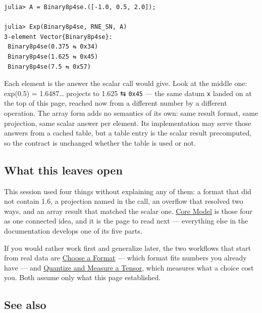 \label{13141607623874117758}{}



\begin{verbatim}
julia> A = Binary8p4se.([-1.0, 0.5, 2.0]);

julia> Exp(Binary8p4se, RNE_SN, A)
3-element Vector{Binary8p4se}:
 Binary8p4se(0.375 ⇆ 0x34)
 Binary8p4se(1.625 ⇆ 0x45)
 Binary8p4se(7.5 ⇆ 0x57)
\end{verbatim}



Each element is the answer the scalar call would give. Look at the middle one: exp(0.5) = 1.6487… projects to 1.625 ⇆ \texttt{0x45} — the same datum \texttt{x} landed on at the top of this page, reached now from a different number by a different operation. The array form adds no semantics of its own: same result format, same projection, same scalar answer per element. Its implementation may serve those answers from a cached table, but a table entry is the scalar result precomputed, so the contract is unchanged whether the table is used or not.



\subsection{What this leaves open}



\label{15263504601444045058}{}


This session used four things without explaining any of them: a format that did not contain 1.6, a projection named in the call, an overflow that resolved two ways, and an array result that matched the scalar one. \href{core\_\allowbreak{}model.md}{Core Model} is those four as one connected idea, and it is the page to read next — everything else in the documentation develops one of its five parts.



If you would rather work first and generalize later, the two workflows that start from real data are \href{workflow\_\allowbreak{}choose\_\allowbreak{}format.md}{Choose a Format} — which format fits numbers you already have — and \href{workflow\_\allowbreak{}quantize\_\allowbreak{}measure.md}{Quantize and Measure a Tensor}, which measures what a choice cost you. Both assume only what this page established.



\subsection{See also}



